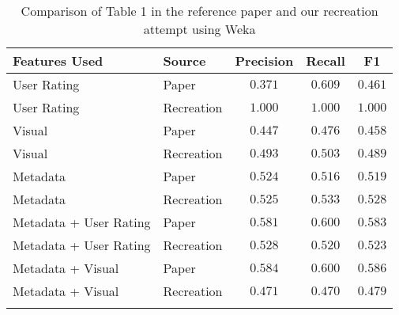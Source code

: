 

\begin{table*}[h]
	\begin{tabular}{|l|l|ccc|}
		\hline
		Features Used & Source & Precision & Recall & F1 \\
		\hline
		User Rating & Paper & $0.371$ & $0.609$ & $0.461$ \\
		User Rating & Recreation & $1.000$ & $1.000$ & $1.000$ \\
		\hline
		Visual & Paper & $0.447$ & $0.476$ & $0.458$ \\
		Visual & Recreation & $0.493$ & $0.503$ & $0.489$ \\
		\hline
		Metadata & Paper & $0.524$ & $0.516$ & $0.519$ \\
		Metadata & Recreation & $0.525$ & $0.533$ & $0.528$ \\
		\hline
		Metadata + User Rating & Paper & $0.581$ & $0.600$ & $0.583$ \\
		Metadata + User Rating & Recreation & $0.528$ & $0.520$ & $0.523$ \\
		\hline
		Metadata + Visual & Paper & $0.584$ & $0.600$ & $0.586$ \\
		Metadata + Visual & Recreation & $0.471$ & $0.470$ & $0.479$ \\
		\hline
		\multicolumn{5}{c}{ } \\
	\end{tabular}
	\caption{Comparison of Table 1 in the reference paper and our recreation attempt using Weka}
	\label{table1}
\end{table*}